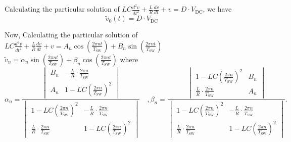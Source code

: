 \documentclass{article}
\begin{document}
Calculating the particular solution of \(LC \frac{d^2 v}{dt^2} + \frac{L}{R} \frac{dv}{dt} + v = D \cdot V_{\text{DC}}\), we have \
$$\widetilde{v}_{0}(t) = D \cdot V_{\text{DC}}$$

Now, Calculating the particular solution of \(LC \frac{d^2 v}{dt^2} + \frac{L}{R} \frac{dv}{dt} + v = A_n \cos\left(\frac{2 \pi n t}{T_{\text{SW}}}\right) + B_n \sin\left(\frac{2 \pi n t}{T_{\text{SW}}}\right)\)\\
$\widetilde{v}_n = \alpha_n\sin\left(\frac{2\pi nt}{T_{\text{SW}}}\right) + \beta_n \cos\left(\frac{2\pi nt}{T_{\text{SW}}}\right)$
where
\[
\alpha_n = \frac
{
\begin{vmatrix}
B_n & -\frac{L}{R}\cdot \frac{2\pi n}{T_{\text{SW}}} \\
A_n & 1- L C \left(\frac{2\pi n}{T_{\text{SW}}}\right)^2
\end{vmatrix}
}
{
\begin{vmatrix}
1- L C \left(\frac{2\pi n}{T_{\text{SW}}}\right)^2 & -\frac{L}{R}\cdot \frac{2\pi n}{T_{\text{SW}}} \\
\frac{L}{R}\cdot \frac{2\pi n}{T_{\text{SW}}} & 1- L C \left(\frac{2\pi n}{T_{\text{SW}}}\right)^2
\end{vmatrix}   
} \quad,
\beta_n = \frac
{
\begin{vmatrix}
1- L C \left(\frac{2\pi n}{T_{\text{SW}}}\right)^2 & B_n \\
\frac{L}{R}\cdot \frac{2\pi n}{T_{\text{SW}}} & A_n
\end{vmatrix}
}
{  
\begin{vmatrix}
1- L C \left(\frac{2\pi n}{T_{\text{SW}}}\right)^2 & -\frac{L}{R}\cdot \frac{2\pi n}{T_{\text{SW}}} \\
\frac{L}{R}\cdot \frac{2\pi n}{T_{\text{SW}}} & 1- L C \left(\frac{2\pi n}{T_{\text{SW}}}\right)^2
\end{vmatrix}
}.
\]
\end{document}
